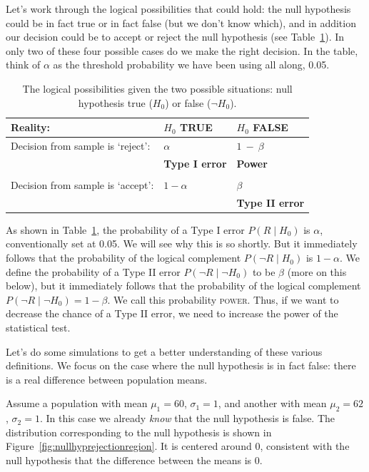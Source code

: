\documentclass[12pt]{book}\usepackage[]{graphicx}\usepackage[]{color}
\begin{document}
Let's work through the logical possibilities that could hold: the null
hypothesis could be in fact true or in fact false (but we don't know
which), and in addition our decision could be to accept or reject the
null hypothesis (see Table~\ref{nulltruefalse}). In only two of these
four possible cases do we make the right decision. In the table, think
of $\alpha$ as the threshold probability we have been using all along,
0.05.

\begin{table}
\centering
\caption{The logical possibilities given the two possible situations:
  null hypothesis true ($H_0$) or false  ($\neg H_0$).}
\label{nulltruefalse}       %
\begin{tabular}{p{5cm}p{3cm}p{3cm}}
\hline
Reality: & $H_0$ TRUE & $H_0$ FALSE \\
\hline
Decision from sample is `reject': & $\alpha$ & $1~-~\beta$ \\
                                     & \textbf{Type I error}                         & \textbf{Power} \\                                      
                                     & & \\
\hline
Decision from sample is `accept': & $1 - \alpha$ & $\beta$ \\
                                    &                                 & \textbf{Type II error}\\
\hline
\end{tabular}
\end{table}

As shown in Table~\ref{nulltruefalse}, the probability of a Type I
error $P(R\mid H_0)$ is $\alpha$, conventionally set at
0.05. We will see why this is so shortly. But it immediately follows
that the probability of the logical complement $P(\neg R\mid H_0)$ is
$1-\alpha$. We define the probability of a Type II error $P(\neg
R\mid\neg H_0)$ to be $\beta$ (more on this below), but it immediately
follows that the probability of the logical complement $P(\neg
R\mid\neg H_0) = 1 - \beta$. We call this probability
\textsc{power}. Thus, if we want to decrease the chance of a Type II
error, we need to increase the power of the statistical test.

Let's do some simulations to get a better understanding of these various
definitions. We focus on the case where the null hypothesis is in
fact 
false: there is a real difference between population means.

Assume a population with mean $\mu_1 = 60$, $\sigma_1 = 1$, and another with mean $\mu_2 = 62$, $\sigma_2 = 1$.
In this case we already \textit{know} that the null hypothesis is false.
The distribution corresponding to the null hypothesis is shown in Figure~\ref{fig:nullhyprejectionregion}. It is centered around 0, consistent with the null hypothesis that the difference between the means is 0.
\end{document}

